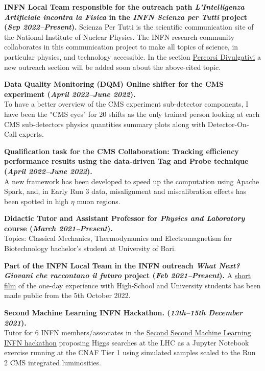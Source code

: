\documentclass[11pt]{res}
\begin{document}
\begin{resume}
\textbf{INFN Local Team responsible for the outreach path \textit{L'Intelligenza Artificiale incontra la Fisica} in the \textit{INFN Scienza per Tutti} project (\textit{Sep 2022--Present}).}
Scienza Per Tutti is the scientific communication site of the National Institute of Nuclear Physics. The INFN research community collaborates in this communication project to make all topics of science, in particular physics, and technology accessible. In the section \href{https://scienzapertutti.infn.it/percorsi-divulgativi}{Percorsi Divulgativi} a new outreach section will be added soon about the above-cited topic.

\textbf{Data Quality Monitoring (DQM) Online shifter for the CMS experiment (\textit{April 2022--June 2022}).}\\
To have a better overview of the CMS experiment sub-detector components, I have been the "CMS eyes" for 20 shifts as the only trained person looking at each CMS sub-detectors physics quantities summary plots along with Detector-On-Call experts.

\textbf{Qualification task for the CMS Collaboration: Tracking efficiency performance results using the data-driven Tag and Probe technique (\textit{April 2022--June 2022}).}\\
A new framework has been developed to speed up the computation using Apache Spark, and, in Early Run 3 data, misalignment and miscalibration effects has been spotted in high $\eta$ muon regions.

\textbf{Didactic Tutor and Assistant Professor for \textit{Physics and Laboratory} course (\textit{March 2021--Present}).}\\
Topics: Classical Mechanics, Thermodynamics and Electromagnetism for Biotechnology bachelor's student at University of Bari.

\textbf{Part of the INFN Local Team in the INFN outreach \textit{What Next? Giovani che raccontano il futuro} project (\textit{Feb 2021--Present}).}
A \href{https://next.infn.it/il-cortometraggio/}{short film} of the one-day experience with High-School and University students has been made public from the 5th October 2022.

\textbf{Second Machine Learning INFN Hackathon. (\textit{13th--15th December 2021}).}\\ 
Tutor for 6 INFN members/associates in the \href{https://agenda.infn.it/event/28565/contributions/148551/}{Second Second Machine Learning INFN hackathon} proposing Higgs searches at the LHC as a Jupyter Notebook exercise running at the CNAF Tier 1 using simulated samples scaled to the Run 2 CMS integrated luminosities.



\end{resume}
\end{document}
